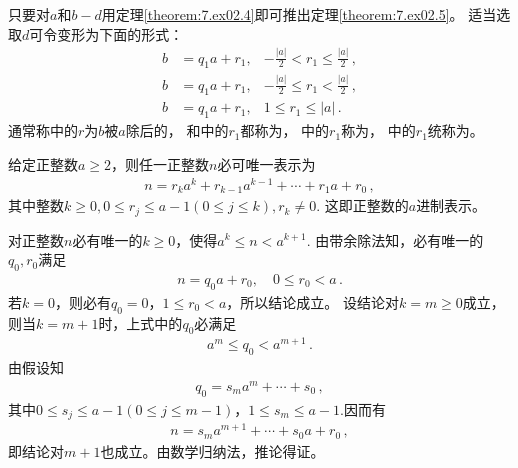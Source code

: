 只要对$a$和$b-d$用定理\ref{theorem:7.ex02.4}即可推出定理\ref{theorem:7.ex02.5}。
适当选取$d$可令变形为下面的形式：
\begin{align}
    b & =q_1a+r_1, & -\frac{|a|}{2}< r_1\le\frac{|a|}{2}\, ,\label{eq:7.ex02.remainder02} \\
    b & =q_1a+r_1, & -\frac{|a|}{2}\le r_1<\frac{|a|}{2}\, ,\label{eq:7.ex02.remainder03} \\
    b & =q_1a+r_1, & 1\le r_1\le |a|\, .\label{eq:7.ex02.remainder04}
\end{align}
通常称中的$r$为$b$被$a$除后的，
和中的$r_1$都称为，
中的$r_1$称为，
中的$r_1$统称为。

\begin{corollary}
    给定正整数$a\ge2$，则任一正整数$n$必可唯一表示为
    \begin{align}
        n=r_ka^k+r_{k-1}a^{k-1}+\cdots+r_1a+r_0\, ,
    \end{align}
    其中整数$k\ge0,0\le r_j\le a-1(0\le j\le k),r_k\neq0$.
    这即正整数的$a$进制表示。
\end{corollary}
\begin{prove}
    对正整数$n$必有唯一的$k\ge 0$，使得$a^k\le n<a^{k+1}$.
    由带余除法知，必有唯一的$q_0,r_0$满足
    \begin{align}
        n=q_0a+r_0,\quad 0\le r_0<a\, .
    \end{align}
    若$k=0$，则必有$q_0=0$，$1\le r_0<a$，所以结论成立。
    设结论对$k=m\ge0$成立，则当$k=m+1$时，上式中的$q_0$必满足
    \begin{align}
        a^m\le q_0<a^{m+1}\, .
    \end{align}
    由假设知
    \begin{align}
        q_0=s_ma^m+\cdots+s_0\, ,
    \end{align}
    其中$0\le s_j\le a-1(0\le j\le m-1)$，$1\le s_m\le a-1$.因而有
    \begin{align}
        n=s_ma^{m+1}+\cdots+s_0a+r_0\, ,
    \end{align}
    即结论对$m+1$也成立。由数学归纳法，推论得证。
\end{prove}

